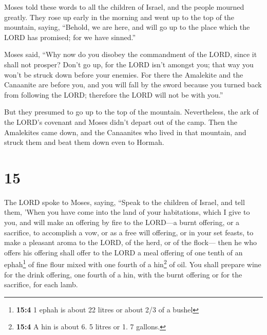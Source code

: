  Moses told these words to all the children of Israel,
and the people mourned greatly.  They rose up early in
the morning and went up to the top of the mountain, saying, ``Behold, we
are here, and will go up to the place which the LORD has promised; for
we have sinned.''

 Moses said, ``Why now do you disobey the commandment of
the LORD, since it shall not prosper?  Don't go up, for
the LORD isn't amongst you; that way you won't be struck down before
your enemies.  For there the Amalekite and the Canaanite
are before you, and you will fall by the sword because you turned back
from following the LORD; therefore the LORD will not be with you.''

 But they presumed to go up to the top of the mountain.
Nevertheless, the ark of the LORD's covenant and Moses didn't depart out
of the camp.  Then the Amalekites came down, and the
Canaanites who lived in that mountain, and struck them and beat them
down even to Hormah.

\hypertarget{section-14}{%
\section{15}\label{section-14}}

 The LORD spoke to Moses, saying,  ``Speak
to the children of Israel, and tell them, 'When you have come into the
land of your habitations, which I give to you,  and will
make an offering by fire to the LORD---a burnt offering, or a sacrifice,
to accomplish a vow, or as a free will offering, or in your set feasts,
to make a pleasant aroma to the LORD, of the herd, or of the flock---
 then he who offers his offering shall offer to the LORD a
meal offering of one tenth of an ephah\footnote{\textbf{15:4} 1 ephah is
  about 22 litres or about 2/3 of a bushel} of fine flour mixed with one
fourth of a hin\footnote{\textbf{15:4} A hin is about 6. 5 litres or 1.
  7 gallons.} of oil.  You shall prepare wine for the
drink offering, one fourth of a hin, with the burnt offering or for the
sacrifice, for each lamb.

